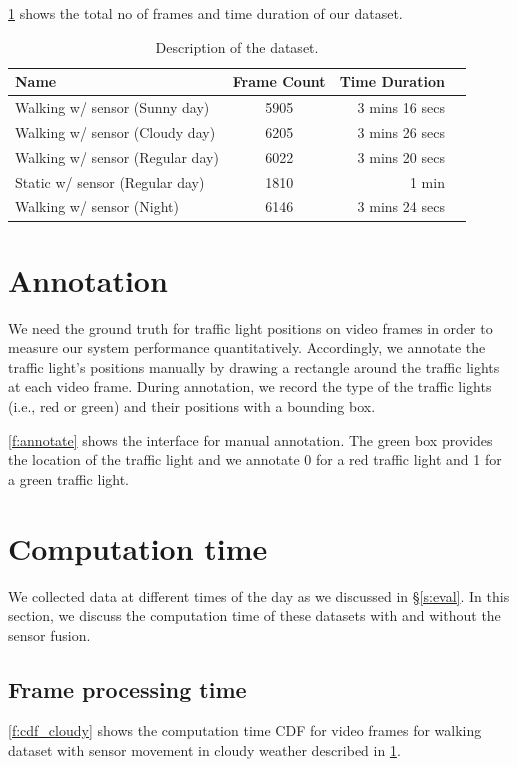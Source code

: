 \ref{t:dataset} shows the total no of frames and time duration of our dataset.

\begin{table}[ht!]
  \centering
  
  \begin{tabular}{  l  c  r r }
    \rowcolor{gray!50}
    Name & Frame Count & Time Duration \\
    \hline
    Walking w/ sensor (Sunny day) & 5905 & 3 mins 16 secs \\
    Walking w/ sensor (Cloudy day) & 6205 & 3 mins 26 secs \\ %
    Walking w/ sensor (Regular day) & 6022 & 3 mins 20 secs \\%
    Static w/ sensor (Regular day) & 1810 & 1 min \\%
    Walking w/ sensor (Night) & 6146 & 3 mins 24 secs \\
    \hline
  \end{tabular}
  \caption{Description of the dataset.}
  \label{t:dataset}
\end{table}

\section{Annotation}
We need the ground truth for traffic light positions on video frames in order to measure our system performance quantitatively.
Accordingly, we annotate the traffic light's positions manually by drawing a rectangle around the traffic lights at each video frame.
During annotation, we record the type of the traffic lights (i.e., red or green) and their positions with a bounding box.

\ref{f:annotate} shows the interface for manual annotation.
The green box provides the location of the traffic light and we annotate 0 for a red traffic light and 1 for a green traffic light.




\section{Computation time}
We collected data at different times of the day as we discussed in \S\ref{s:eval}.
In this section, we discuss the computation time of these datasets with and without the sensor fusion.

\subsection{Frame processing time}
\ref{f:cdf_cloudy} shows the computation time CDF for video frames for walking dataset with sensor movement in cloudy weather described in \ref{t:dataset}.

